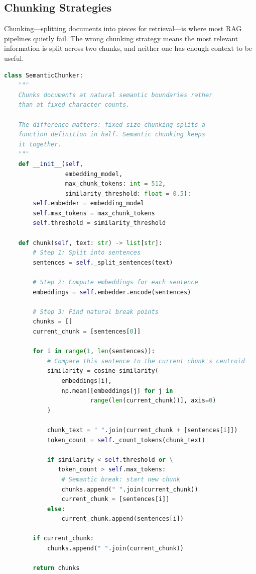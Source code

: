 \subsection{Chunking Strategies}

Chunking---splitting documents into pieces for retrieval---is where most RAG pipelines quietly fail. The wrong chunking strategy means the most relevant information is split across two chunks, and neither one has enough context to be useful.

\begin{lstlisting}[language=Python, caption={Semantic chunking: split at meaning boundaries, not character counts}]
class SemanticChunker:
    """
    Chunks documents at natural semantic boundaries rather
    than at fixed character counts.
    
    The difference matters: fixed-size chunking splits a
    function definition in half. Semantic chunking keeps
    it together.
    """
    def __init__(self, 
                 embedding_model,
                 max_chunk_tokens: int = 512,
                 similarity_threshold: float = 0.5):
        self.embedder = embedding_model
        self.max_tokens = max_chunk_tokens
        self.threshold = similarity_threshold
    
    def chunk(self, text: str) -> list[str]:
        # Step 1: Split into sentences
        sentences = self._split_sentences(text)
        
        # Step 2: Compute embeddings for each sentence
        embeddings = self.embedder.encode(sentences)
        
        # Step 3: Find natural break points
        chunks = []
        current_chunk = [sentences[0]]
        
        for i in range(1, len(sentences)):
            # Compare this sentence to the current chunk's centroid
            similarity = cosine_similarity(
                embeddings[i],
                np.mean([embeddings[j] for j in 
                        range(len(current_chunk))], axis=0)
            )
            
            chunk_text = " ".join(current_chunk + [sentences[i]])
            token_count = self._count_tokens(chunk_text)
            
            if similarity < self.threshold or \
               token_count > self.max_tokens:
                # Semantic break: start new chunk
                chunks.append(" ".join(current_chunk))
                current_chunk = [sentences[i]]
            else:
                current_chunk.append(sentences[i])
        
        if current_chunk:
            chunks.append(" ".join(current_chunk))
        
        return chunks
\end{lstlisting}

